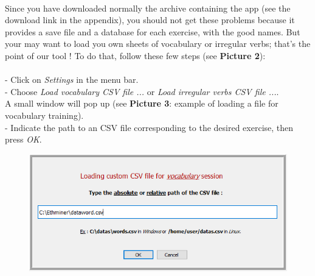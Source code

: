 \documentclass[12pt, a4paper]{report}
\begin{document}
\paragraph{}Since you have downloaded normally the archive containing the app (see the download link in the appendix), you should not get these problems because it provides a save file and a database for each exercise, with the good names. But your may want to load you own sheets of vocabulary or irregular verbs; that's the point of our tool ! To do that, follow these few steps (see \textbf{Picture 2}):\\
\\
\hspace*{0.5cm}- Click on \textit{Settings} in the menu bar.\\
\hspace*{0.5cm}- Choose \textit{Load vocabulary CSV file ...} or \textit{Load irregular verbs CSV file ...}.\\ A small window will pop up (see \textbf{Picture 3}: example of loading a file for vocabulary training).\\
\hspace*{0.5cm}- Indicate the path to an CSV file corresponding to the desired exercise, then press \textit{OK}.\\

\begin{figure}[H]
    \centering
    \includegraphics[scale=0.55]{images/load.png}
\end{figure}
\end{document}
